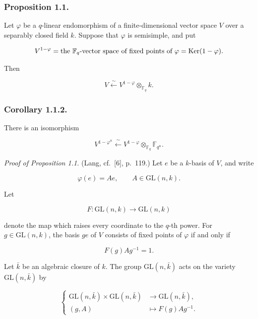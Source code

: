 \subsubsection*{Proposition 1.1.}
Let $\varphi$ be a $q$-linear endomorphism of a finite-dimensional vector
space $V$ over a separably closed field $k$. Suppose that $\varphi$ is
semisimple, and put

\[
V^{1-\varphi}
=\text{the $\mathbb F_q$-vector space of fixed points of $\varphi$}
=\operatorname{Ker}(1-\varphi).
\]

Then

\begin{equation}\tag{1.1.1}
V\xleftarrow{\ \sim\ }
V^{1-\varphi}\otimes_{\mathbb F_q}k.
\end{equation}

\subsubsection*{Corollary 1.1.2.}
There is an isomorphism

\[
V^{1-\varphi^n}\xleftarrow{\ \sim\ }
V^{1-\varphi}\otimes_{\mathbb F_q}\mathbb F_{q^n}.
\]

\medskip
\noindent\emph{Proof of Proposition 1.1.}
(Lang, cf.~[6], p.~119.)
Let $e$ be a $k$-basis of $V$, and write

\begin{equation}\tag{1.1.3}
\varphi(e)=Ae,\qquad A\in\mathrm{GL}(n,k).
\end{equation}

Let

\begin{equation}\tag{1.1.4}
F:\mathrm{GL}(n,k)\longrightarrow\mathrm{GL}(n,k)
\end{equation}

denote the map which raises every coordinate to the $q$-th power. For
$g\in\mathrm{GL}(n,k)$, the basis $ge$ of $V$ consists of fixed points of
$\varphi$ if and only if

\begin{equation}\tag{1.1.5}
F(g)Ag^{-1}=1.
\end{equation}

Let $\bar k$ be an algebraic closure of $k$. The group
$\mathrm{GL}(n,\bar k)$ acts on the variety $\mathrm{GL}(n,\bar k)$ by

\begin{equation}\tag{1.1.6}
\left\{
\begin{aligned}
\mathrm{GL}(n,\bar k)\times\mathrm{GL}(n,\bar k)
&\longrightarrow\mathrm{GL}(n,\bar k),\\
(g,A)&\longmapsto F(g)Ag^{-1}.
\end{aligned}
\right.
\end{equation}

